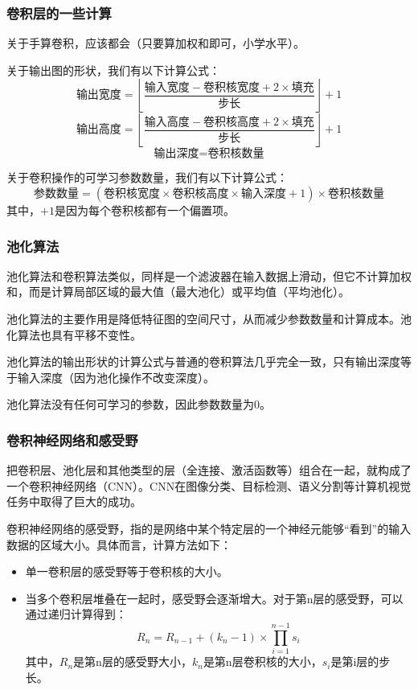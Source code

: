 \documentclass[aspectratio=1610]{ctexbeamer}
\begin{document}
\begin{frame}
    \frametitle{卷积层的一些计算}

    关于手算卷积，应该都会（只要算加权和即可，小学水平）。

    关于输出图的形状，我们有以下计算公式：
\begin{equation}
\text{输出宽度} = \left\lfloor \frac{\text{输入宽度} - \text{卷积核宽度} + 2 \times \text{填充}}{\text{步长}} \right\rfloor + 1
\end{equation}
\begin{equation}
\text{输出高度} = \left\lfloor \frac{\text{输入高度} - \text{卷积核高度} + 2 \times \text{填充}}{\text{步长}} \right\rfloor + 1
\end{equation}
\begin{equation}
\text{输出深度} = \text{卷积核数量}
\end{equation}

    关于卷积操作的可学习参数数量，我们有以下计算公式：
\begin{equation}
\text{参数数量} = (\text{卷积核宽度} \times \text{卷积核高度} \times \text{输入深度} + 1) \times \text{卷积核数量}
\end{equation}
    其中，$+1$是因为每个卷积核都有一个偏置项。

\end{frame}

\begin{frame}
    \frametitle{池化算法}

    池化算法和卷积算法类似，同样是一个滤波器在输入数据上滑动，但它不计算加权和，而是计算局部区域的最大值（最大池化）或平均值（平均池化）。

    池化算法的主要作用是降低特征图的空间尺寸，从而减少参数数量和计算成本。池化算法也具有平移不变性。

    池化算法的输出形状的计算公式与普通的卷积算法几乎完全一致，只有输出深度等于输入深度（因为池化操作不改变深度）。

    池化算法没有任何可学习的参数，因此参数数量为0。

\end{frame}

\begin{frame}
    \frametitle{卷积神经网络和感受野}

    把卷积层、池化层和其他类型的层（全连接、激活函数等）组合在一起，就构成了一个卷积神经网络（CNN）。CNN在图像分类、目标检测、语义分割等计算机视觉任务中取得了巨大的成功。

    卷积神经网络的感受野，指的是网络中某个特定层的一个神经元能够“看到”的输入数据的区域大小。具体而言，计算方法如下：
    \begin{itemize}
        \item 单一卷积层的感受野等于卷积核的大小。
        \item 当多个卷积层堆叠在一起时，感受野会逐渐增大。对于第n层的感受野，可以通过递归计算得到：
\begin{equation}
R_n = R_{n-1} + (k_n - 1) \times \prod_{i=1}^{n-1} s_i
\end{equation}
其中，$R_n$是第n层的感受野大小，$k_n$是第n层卷积核的大小，$s_i$是第i层的步长。
    \end{itemize}

\end{frame}
\end{document}
